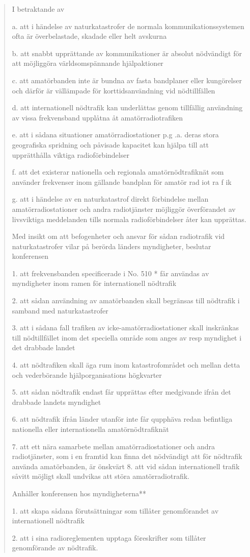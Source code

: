 \begin{quote}
I betraktande av

a. att i händelse av naturkatastrofer de normala kommunikationssystemen ofta är
överbelastade, skadade eller helt avskurna

b. att snabbt upprättande av kommunikationer är absolut nödvändigt för att
möjliggöra världsomspännande hjälpaktioner

c. att amatörbanden inte är bundna av fasta bandplaner eller kungörelser och
därför är vällämpade för korttidsanvändning vid nödtillfällen

d. att internationell nödtrafik kan underlättas genom tillfällig användning av
vissa frekvensband upplåtna åt amatörradiotrafiken

e. att i sådana situationer amatörradiostationer p.g .a. deras stora geografiska
spridning och påvisade kapacitet kan hjälpa till att upprätthålla viktiga
radioförbindelser

f. att det existerar nationella och regionala amatörnödtrafiknät som använder
frekvenser inom gällande bandplan för amatör rad iot ra f ik

g. att i händelse av en naturkatastrof direkt förbindelse mellan
amatörradiostationer och andra radiotjänster möjliggör överförandet av
livsviktiga meddelanden tills normala radioförbindelser åter kan upprättas.

Med
insikt om att befogenheter och ansvar för sådan radiotrafik vid naturkatastrofer
vilar på berörda länders myndigheter, beslutar konferensen

1. att frekvensbanden specificerade i No. 510 * får användas av myndigheter
inom ramen för internationell nödtrafik

2. att sådan användning av amatörbanden skall begränsas till nödtrafik i samband
med naturkatastrofer

3. att i sådana fall trafiken av icke-amatörradiostationer skall inskränkas till
nödtillfället inom det speciella område som anges av resp myndighet i det
drabbade landet

4. att nödtrafiken skall äga rum inom katastrofområdet och mellan detta och
vederbörande hjälporganisations högkvarter

5. att sådan nödtrafik endast får upprättas efter medgivande ifrån det drabbade
landets myndighet

6. att nödtrafik ifrån länder utanför inte får qupphäva redan befintliga
nationella eller internationella amatörnödtrafiknät

7. att ett nära samarbete mellan amatörradiostationer och andra radiotjänster,
som i en framtid kan finna det nödvändigt att för nödtrafik använda
amatörbanden, är önskvärt 8. att vid sådan internationell trafik såvitt möjligt
skall undvikas att störa amatörradiotrafik.

Anhåller konferensen hos myndigheterna**

1. att skapa sådana förutsättningar som tillåter genomförandet av internationell
nödtrafik

2. att i sina radioreglementen upptaga föreskrifter som tillåter genomförande av
nödtrafik.
\end{quote}

